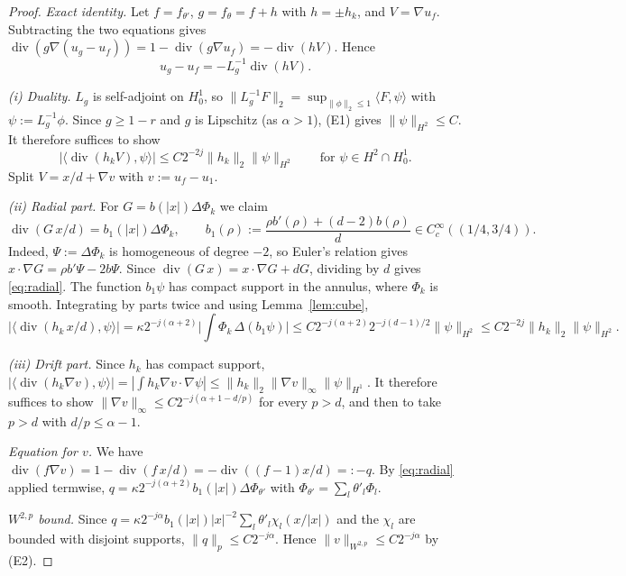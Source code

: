\documentclass[11pt]{article}
\theoremstyle{definition}
\theoremstyle{remark}
\newcommand{\dv}{\operatorname{div}}
\begin{document}
\begin{proof}
\emph{Exact identity.} Let $f=f_{\theta'}$, $g=f_\theta=f+h$ with $h=\pm h_k$, and $V=\nabla u_f$. Subtracting the two equations gives $\dv(g\nabla(u_g-u_f))=1-\dv(g\nabla u_f)=-\dv(hV)$. Hence
\[
u_g-u_f=-L_g^{-1}\dv(hV).
\]

\emph{(i) Duality.} $L_g$ is self-adjoint on $H^1_0$, so
$\|L_g^{-1}F\|_2=\sup_{\|\phi\|_2\le1}\langle F,\psi\rangle$ with $\psi:=L_g^{-1}\phi$.
Since $g\ge1-r$ and $g$ is Lipschitz (as $\alpha>1$), (E1) gives $\|\psi\|_{H^2}\le C$. It therefore suffices to show
\begin{equation}\label{eq:dual}
|\langle\dv(h_kV),\psi\rangle|\le C2^{-2j}\|h_k\|_2\|\psi\|_{H^2}\qquad\text{for }\psi\in H^2\cap H^1_0 .
\end{equation}
Split $V=x/d+\nabla v$ with $v:=u_f-u_1$.

\emph{(ii) Radial part.} For $G=b(|x|)\Delta\Phi_k$ we claim
\begin{equation}\label{eq:radial}
\dv(G\,x/d)=b_1(|x|)\Delta\Phi_k,\qquad b_1(\rho):=\frac{\rho b'(\rho)+(d-2)b(\rho)}{d}\in C^\infty_c((1/4,3/4)).
\end{equation}
Indeed, $\Psi:=\Delta\Phi_k$ is homogeneous of degree $-2$, so Euler's relation gives $x\cdot\nabla G=\rho b'\Psi-2b\Psi$. Since $\dv(G\,x)=x\cdot\nabla G+dG$, dividing by $d$ gives \eqref{eq:radial}. The function $b_1\psi$ has compact support in the annulus, where $\Phi_k$ is smooth. Integrating by parts twice and using Lemma~\ref{lem:cube},
\[
|\langle\dv(h_k\,x/d),\psi\rangle|=\kappa2^{-j(\alpha+2)}\Big|\int\Phi_k\,\Delta(b_1\psi)\Big|\le C2^{-j(\alpha+2)}2^{-j(d-1)/2}\|\psi\|_{H^2}\le C2^{-2j}\|h_k\|_2\|\psi\|_{H^2}.
\]

\emph{(iii) Drift part.} Since $h_k$ has compact support,
$|\langle\dv(h_k\nabla v),\psi\rangle|=|\int h_k\nabla v\cdot\nabla\psi|\le\|h_k\|_2\|\nabla v\|_\infty\|\psi\|_{H^1}$.
It therefore suffices to show $\|\nabla v\|_\infty\le C2^{-j(\alpha+1-d/p)}$ for every $p>d$, and then to take $p>d$ with $d/p\le\alpha-1$.

\emph{Equation for $v$.} We have $\dv(f\nabla v)=1-\dv(f\,x/d)=-\dv((f-1)x/d)=:-q$. By \eqref{eq:radial} applied termwise,
$q=\kappa2^{-j(\alpha+2)}b_1(|x|)\Delta\Phi_{\theta'}$ with $\Phi_{\theta'}=\sum_l\theta'_l\Phi_l$.

\emph{$W^{2,p}$ bound.} Since $q=\kappa2^{-j\alpha}b_1(|x|)|x|^{-2}\sum_l\theta'_l\chi_l(x/|x|)$ and the $\chi_l$ are bounded with disjoint supports, $\|q\|_p\le C2^{-j\alpha}$. Hence $\|v\|_{W^{2,p}}\le C2^{-j\alpha}$ by (E2).


\end{proof}
\end{document}
